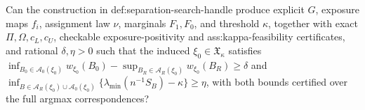 Can the construction in def:separation-search-handle produce explicit \(G\), exposure maps \(f_i\), assignment law \(\nu\), marginals \(F_1,F_0\), and threshold \(\kappa\), together with exact \(\Pi,\Omega,c_L,c_U\), checkable exposure-positivity and ass:kappa-feasibility certificates, and rational \(\delta,\eta>0\) such that the induced \(\xi_0\in\mathfrak X_\kappa\) satisfies \(\inf_{B_0\in\mathcal A_0(\xi_0)}w_{\xi_0}(B_0)-\sup_{B_R\in\mathcal A_R(\xi_0)}w_{\xi_0}(B_R)\ge\delta\) and \(\inf_{B\in\mathcal A_R(\xi_0)\cup\mathcal A_0(\xi_0)}\{\lambda_{\min}(n^{-1}S_B)-\kappa\}\ge\eta\), with both bounds certified over the full argmax correspondences?